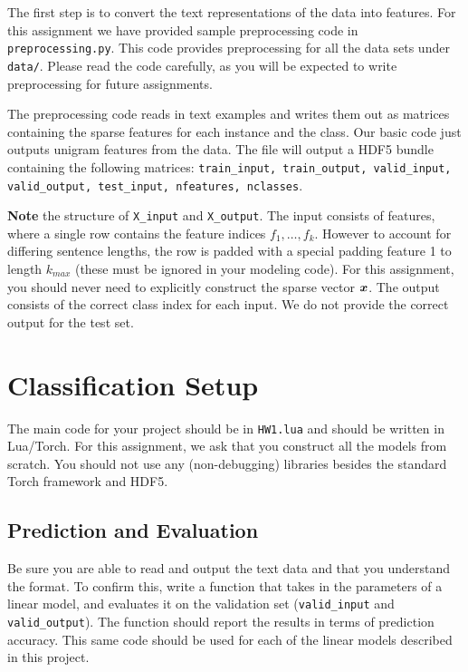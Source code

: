 \documentclass[11pt]{article}
\begin{document}
The first step is to convert the text representations of the data into
features. For this assignment we have provided sample preprocessing
code in \texttt{preprocessing.py}. This code provides preprocessing 
for all the data sets under \texttt{data/}. Please read the code
carefully, as you will be expected to write preprocessing for future
assignments.

The preprocessing code reads in text examples and writes them
out as matrices containing the sparse features for each instance and
the class. Our basic code just outputs unigram features from the data.
The file will output a HDF5 bundle containing the following matrices:
\texttt{train\_input, train\_output, valid\_input, valid\_output,
  test\_input, nfeatures, nclasses}.

\textbf{Note} the structure of \texttt{X\_input} and
\texttt{X\_output}. The input consists of features, where a single row
contains the feature indices $f_1, \ldots, f_k$. However to account
for differing sentence lengths, the row is padded with a special
padding feature 1 to length $k_{max}$ (these must be ignored in your modeling
code).  For this assignment, you should never need to explicitly
construct the sparse vector $\boldsymbol{x}$. The output consists of the
correct class index for each input. We do not provide the correct
output for the test set.

\section{Classification Setup}

The main code for your project should be in \texttt{HW1.lua} and
should be written in Lua/Torch. For this assignment, we ask that you
construct all the models from scratch. You should not use any
(non-debugging) libraries besides the standard Torch framework and HDF5.

\subsection{Prediction and Evaluation}

Be sure you are able to read and output the text data and that you
understand the format. To confirm this, write a function that takes in
the parameters of a linear model, and evaluates it on the validation
set (\texttt{valid\_input} and \texttt{valid\_output}).  The function
should report the results in terms of prediction accuracy. This same
code should be used for each of the linear models described in this
project.
\end{document}

